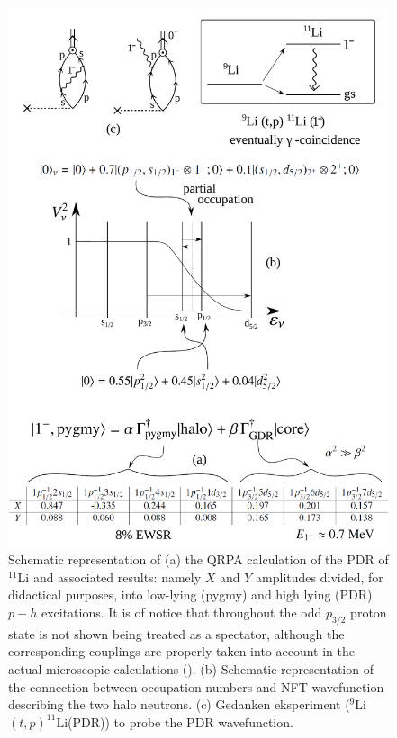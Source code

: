 \begin{subappendices}
\begin{figure}
\centerline{\includegraphics*[width=14cm,angle=0]{nutshell/figs/fig3C1}}
\caption{Schematic representation of (a) the QRPA calculation of the PDR of $^{11}$Li and associated results: namely $X$ and $Y$ amplitudes divided, for didactical purposes, into low-lying (pygmy) and high lying (PDR) $p-h$ excitations. It is of notice that throughout the odd $p_{3/2}$ proton state is not shown being treated as a spectator, although the corresponding couplings are properly taken  into account in the actual microscopic calculations (\cite{Barranco:01}). (b) Schematic representation of the connection between occupation numbers and NFT wavefunction describing the two halo neutrons. (c) Gedanken eksperiment ($^9$Li$(t,p)^{11}$Li(PDR)) to probe the PDR wavefunction. }\label{fig3C1}
\end{figure}

\end{subappendices}
